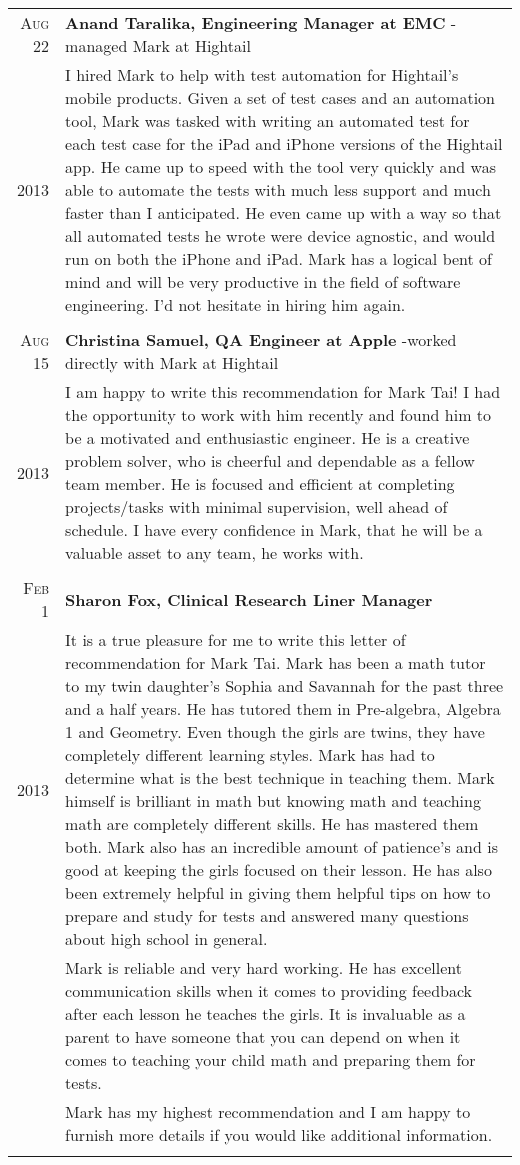 \documentclass[a4paper,10pt]{article}
\begin{document}
\begin{tabular}{r|p{15cm}}
 \textsc{Aug 22} & \textbf{Anand Taralika, Engineering Manager at EMC} - managed Mark at Hightail\\ 
 \textsc{2013} & I hired Mark to help with test automation for Hightail's mobile products. Given a set of test cases and an automation tool, Mark was tasked with writing an automated test for each test case for the iPad and iPhone versions of the Hightail app. He came up to speed with the tool very quickly and was able to automate the tests with much less support and much faster than I anticipated. He even came up with a way so that all automated tests he wrote were device agnostic, and would run on both the iPhone and iPad. Mark has a logical bent of mind and will be very productive in the field of software engineering. I'd not hesitate in hiring him again. \\
 \multicolumn{2}{c}{} \\

 \textsc{Aug 15} & \textbf{Christina Samuel, QA Engineer at Apple } -worked directly with Mark at Hightail\\ 
 \textsc{2013} & I am happy to write this recommendation for Mark Tai! I had the opportunity to work with him recently and found him to be a motivated and enthusiastic engineer. He is a creative problem solver, who is cheerful and dependable as a fellow team member. He is focused and efficient at completing projects/tasks with minimal supervision, well ahead of schedule. I have every confidence in Mark, that he will be a valuable asset to any team, he works with. \\
 \multicolumn{2}{c}{} \\
 
 \textsc{Feb 1} & \textbf{Sharon Fox, Clinical Research Liner Manager} \\ 
 \textsc{2013} & It is a true pleasure for me to write this letter of recommendation for Mark Tai. Mark has been a math tutor to my twin daughter’s Sophia and Savannah for the past three and a half years. He has tutored them in Pre-algebra, Algebra 1 and Geometry. Even though the girls are twins, they have completely different learning styles. Mark has had to determine what is the best technique in teaching them. Mark himself is brilliant in math but knowing math and teaching math are completely different skills. He has mastered them both. Mark also has an incredible amount of patience’s and is good at keeping the girls focused on their lesson. He has also been extremely helpful in giving them helpful tips on how to prepare and study for tests and answered many questions about high school in general. \\
 & Mark is reliable and very hard working. He has excellent communication skills when it comes to providing feedback after each lesson he teaches the girls. It is invaluable as a parent to have someone that you can depend on when it comes to teaching your child math and preparing them for tests.\\
 & Mark has my highest recommendation and I am happy to furnish more details if you would like additional information. \\
 \multicolumn{2}{c}{} \\
 

\end{tabular}
\end{document}
